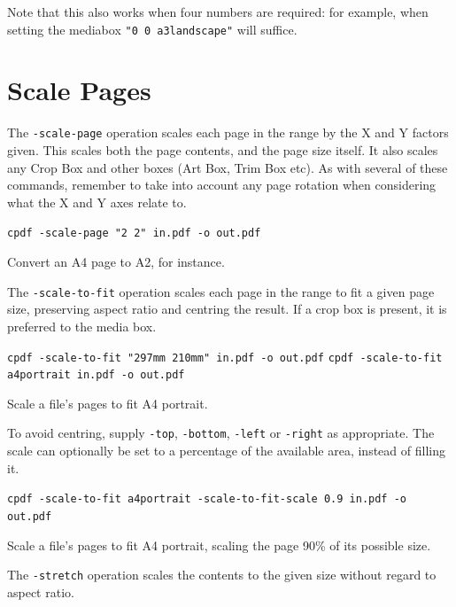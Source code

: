 \documentclass{book}
\begin{document}
\noindent Note that this also works when four numbers are required: for example, when setting the mediabox \texttt{"0 0 a3landscape"} will suffice.

  \section{Scale Pages}
  The \texttt{-scale-page} operation scales each page in the range by the X and
Y factors given. This scales both the page contents, and the page size itself. It also scales any Crop Box and other boxes (Art Box, Trim Box etc). As with several of these commands, remember to take into account any page rotation when considering what the X and Y axes relate to.

  \begin{framed}
  \small\noindent\verb!cpdf -scale-page "2 2" in.pdf -o out.pdf!

  \vspace{2.5mm}
  \noindent Convert an A4 page to A2, for instance.
  \end{framed}

  \noindent The \texttt{-scale-to-fit} operation scales each page in the range to fit a
  given page size, preserving aspect ratio and centring the result. If a crop box is present, it is preferred to the media box.

  \begin{framed}
  \small\noindent\verb!cpdf -scale-to-fit "297mm 210mm" in.pdf -o out.pdf!
  \small\noindent\verb!cpdf -scale-to-fit a4portrait in.pdf -o out.pdf!

  \vspace{2.5mm}
  \noindent Scale a file's pages to fit A4 portrait.
  \end{framed}
  
\noindent To avoid centring, supply \texttt{-top}, \texttt{-bottom}, \texttt{-left} or \texttt{-right} as appropriate. The scale can optionally be set to a percentage of the available area, instead of filling it.

  \begin{framed}
  \small\noindent\verb!cpdf -scale-to-fit a4portrait -scale-to-fit-scale 0.9 in.pdf -o out.pdf!


  \vspace{2.5mm}
  \noindent Scale a file's pages to fit A4 portrait, scaling the page 90\% of its possible size.
  \end{framed}

\noindent The \texttt{-stretch} operation scales the contents to the given size without regard to aspect ratio.
\end{document}
